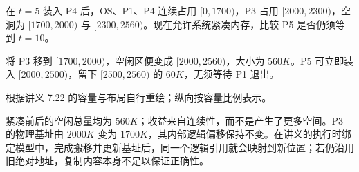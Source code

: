 在 $t=5$ 装入 P4 后，OS、P1、P4 连续占用 $[0,1700)$，P3 占用 $[2000,2300)$，空洞为 $[1700,2000)$ 与 $[2300,2560)$。现在允许系统紧凑内存，比较 P5 是否仍须等到 $t=10$。

\begin{checkedsolution}
将 P3 移到 $[1700,2000)$，空闲区便变成 $[2000,2560)$，大小为 $560K$。P5 可立即装入 $[2000,2500)$，留下 $[2500,2560)$ 的 $60K$，无须等待 P1 退出。

\begin{center}

\par\small 根据讲义 7.22 的容量与布局自行重绘；纵向按容量比例表示。
\end{center}

紧凑前后的空闲总量均为 $560K$；收益来自连续性，而不是产生了更多空间。P3 的物理基址由 $2000K$ 变为 $1700K$，其内部逻辑偏移保持不变。在讲义的执行时绑定模型中，完成搬移并更新基址后，同一个逻辑引用就会映射到新位置；若仍沿用旧绝对地址，复制内容本身不足以保证正确性。
\end{checkedsolution}
